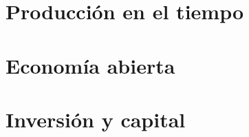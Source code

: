 \documentclass[8pt,a4paper]{extarticle}
\begin{document}
\begin{multicols}{3}
	\newpage

	\part{Producción en el tiempo}

	\newpage

	\part{Economía abierta}

	\newpage

	\part{Inversión y capital}

	\vfill\eject
	\columnbreak
\end{multicols}
\end{document}
